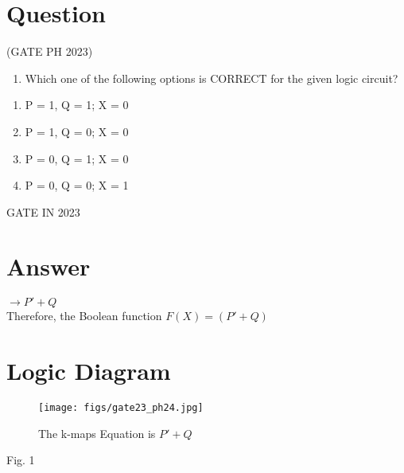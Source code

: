 \documentclass{article}
\title{\mytitle}
\author{\myauthor\\\mycontact\\IITH\hspace{0.3em}-\hspace{0.3em}\mymodule}
\theoremstyle{remark}
\begin{document}
\maketitle
\tableofcontents

\section{\textbf{Question}}
\hfill(GATE PH 2023)
\begin{enumerate}
    \item  Which one of the following options is CORRECT for the given logic circuit?
\end{enumerate}
\vspace{1.0mm}
\begin{enumerate}[label=(\alph*)]
    \item P = 1, Q = 1; X = 0
    \item P = 1, Q = 0; X = 0
    \item P = 0, Q = 1; X = 0
    \item P = 0, Q = 0; X = 1
\end{enumerate}
\hfill{GATE IN 2023}
    \section{\textbf{Answer}}
    $\rightarrow P'+ Q$\\
    Therefore, the Boolean function $F(X)=(P' + Q)$
   \section{\textbf{Logic Diagram}}
 \begin{figure}[H]
        \centering
        \texttt{[image: figs/gate23\_ph24.jpg]}
        \caption{The k-maps Equation is $P'+Q$}
        \label{gate23_ph24.jpg}
    \end{figure}  
    
\begin{center}
Fig. 1 
\end{center}
\end{document}
